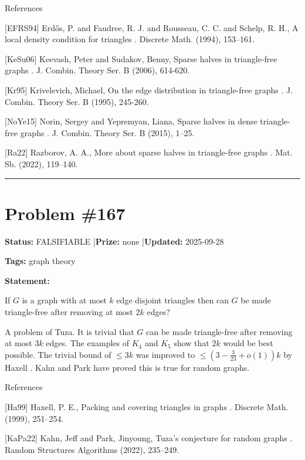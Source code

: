 \documentclass{article}
\begin{document}
References

[EFRS94] Erd\H{o}s, P. and Faudree, R. J. and Rousseau, C. C. and Schelp, R. H., A local density condition for triangles . Discrete Math. (1994), 153--161.

[KeSu06] Keevash, Peter and Sudakov, Benny, Sparse halves in triangle-free graphs . J. Combin. Theory Ser. B (2006), 614-620.

[Kr95] Krivelevich, Michael, On the edge distribution in triangle-free graphs . J. Combin. Theory Ser. B (1995), 245-260.

[NoYe15] Norin, Sergey and Yepremyan, Liana, Sparse halves in dense triangle-free graphs . J. Combin. Theory Ser. B (2015), 1--25.

[Ra22] Razborov, A. A., More about sparse halves in triangle-free graphs . Mat. Sb. (2022), 119--140.

\noindent\rule{\linewidth}{0.4pt}


\section{Problem \#167}
\label{prob:167}

\noindent\textbf{Status:} FALSIFIABLE \quad|\quad \textbf{Prize:} none \quad|\quad \textbf{Updated:} 2025-09-28

\noindent\textbf{Tags:} graph theory

\medskip

\noindent\textbf{Statement:}

If $G$ is a graph with at most $k$ edge disjoint triangles then can $G$ be made triangle-free after removing at most $2k$ edges?




A problem of Tuza. It is trivial that $G$ can be made triangle-free after removing at most $3k$ edges. The examples of $K_4$ and $K_5$ show that $2k$ would be best possible. The trivial bound of $\leq 3k$ was improved to $\leq (3-\frac{3}{23}+o(1))k$ by Haxell \cite{Ha99}. Kahn and Park \cite{KaPa22} have proved this is true for random graphs.




References

[Ha99] Haxell, P. E., Packing and covering triangles in graphs . Discrete Math. (1999), 251--254.

[KaPa22] Kahn, Jeff and Park, Jinyoung, Tuza's conjecture for random graphs . Random Structures Algorithms (2022), 235--249.
\end{document}
